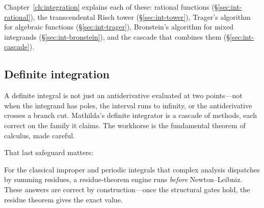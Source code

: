 Chapter~\ref{ch:integration} explains each of these: rational functions
(\S\ref{sec:int-rational}), the transcendental Risch tower
(\S\ref{sec:int-tower}), Trager's algorithm for algebraic functions
(\S\ref{sec:int-trager}), Bronstein's algorithm for mixed integrands
(\S\ref{sec:int-bronstein}), and the cascade that combines them
(\S\ref{sec:int-cascade}).

\subsection{Definite integration}
\label{ssec:calc-definite}

A definite integral is not just an antiderivative evaluated at two points---not
when the integrand has poles, the interval runs to infinity, or the
antiderivative crosses a branch cut. Mathilda's definite integrator is a cascade
of methods, each correct on the family it claims. The workhorse is the
fundamental theorem of calculus, made careful.

\begin{codepairs}
\end{codepairs}

 That last safeguard matters:

\begin{codepairs}
\end{codepairs}

For the classical improper and periodic integrals that complex analysis dispatches
by summing residues, a residue-theorem engine runs \emph{before} Newton--Leibniz.
These answers are correct by construction---once the structural gates hold, the
residue theorem gives the exact value.

